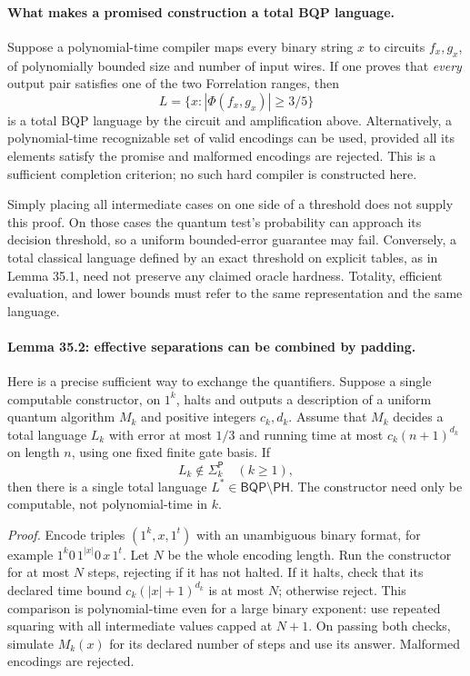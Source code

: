 \documentclass[11pt]{article}
\begin{document}
\paragraph{What makes a promised construction a total BQP language.}
Suppose a polynomial-time compiler maps every binary string $x$ to
circuits $f_x,g_x$, of polynomially bounded size and number of input wires.
If one proves that \emph{every} output pair satisfies one of the two
Forrelation ranges, then
\[
                 L=\{x:|\Phi(f_x,g_x)|\ge3/5\}
\]
is a total BQP language by the circuit and amplification above. Alternatively,
a polynomial-time recognizable set of valid encodings can be used, provided
all its elements satisfy the promise and malformed encodings are rejected.
This is a sufficient completion criterion; no such hard compiler is
constructed here.

Simply placing all intermediate cases on one side of a threshold does
not supply this proof. On those cases the quantum test's probability can
approach its decision threshold, so a uniform bounded-error guarantee
may fail. Conversely, a total classical language defined by an exact
threshold on explicit tables, as in Lemma 35.1, need not preserve any
claimed oracle hardness. Totality, efficient evaluation, and lower bounds
must refer to the same representation and the same language.

\paragraph{Lemma 35.2: effective separations can be combined by padding.}
Here is a precise sufficient way to exchange the quantifiers. Suppose a
single computable constructor, on $1^k$, halts and outputs a description
of a uniform quantum algorithm $M_k$ and positive integers $c_k,d_k$.
Assume that $M_k$ decides a total language $L_k$ with error at most $1/3$
and running time at most $c_k(n+1)^{d_k}$ on length $n$, using one fixed
finite gate basis. If
\begin{equation}\label{r35:levels}
                L_k\notin\Sigma_k^{\mathsf P}\quad(k\ge1),
\end{equation}
then there is a single total language $L^*\in\mathsf{BQP}\setminus\mathsf{PH}$.
The constructor need only be computable, not polynomial-time in $k$.

\emph{Proof.} Encode triples $(1^k,x,1^t)$ with an unambiguous binary
format, for example
$1^k0\,1^{|x|}0\,x\,1^t$. Let $N$ be the whole encoding length.
Run the constructor for at most $N$ steps, rejecting if it has not halted.
If it halts, check that its declared time bound
$c_k(|x|+1)^{d_k}$ is at most $N$; otherwise reject. This comparison is
polynomial-time even for a large binary exponent: use repeated squaring
with all intermediate values capped at $N+1$. On passing both checks,
simulate $M_k(x)$ for its declared number of steps and use its answer.
Malformed encodings are rejected.
\end{document}
